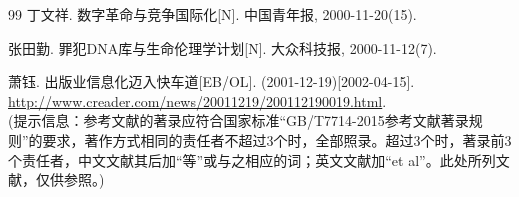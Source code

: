 \begin{thebibliography}{99}
 丁文祥. 数字革命与竞争国际化[N]. 中国青年报, 2000-11-20(15).

 张田勤. 罪犯DNA库与生命伦理学计划[N]. 大众科技报, 2000-11-12(7).

 萧钰. 出版业信息化迈入快车道[EB/OL]. (2001-12-19)[2002-04-15].  
\url{http://www.creader.com/news/20011219/200112190019.html}.\\
(提示信息：参考文献的著录应符合国家标准“GB/T7714-2015参考文献著录规则”的要求，著作方式相同的责任者不超过3个时，全部照录。超过3个时，著录前3个责任者，中文文献其后加“等”或与之相应的词；英文文献加“et al”。此处所列文献，仅供参照。)

\end{thebibliography}

